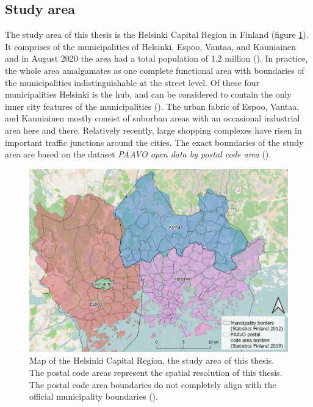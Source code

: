 \subsection{Study area}
\justify

The study area of this thesis is the Helsinki Capital Region in Finland (figure \ref{fig:thesis_resarea}). It comprises of the municipalities of Helsinki, Espoo, Vantaa, and Kauniainen and in August 2020 the area had a total population of 1.2 million (\cite{StatisticsFinland2020a}). In practice, the whole area amalgamates as one complete functional area with boundaries of the municipalities indistinguishable at the street level. Of these four municipalities Helsinki is the hub, and can be considered to contain the only inner city features of the municipalities (\cite{FinnishEnvironmentInstitute2013}). The urban fabric of Espoo, Vantaa, and Kauniainen mostly consist of suburban areas with an occasional industrial area here and there. Relatively recently, large shopping complexes have risen in important traffic junctions around the cities. The exact boundaries of the study area are based on the dataset \textit{PAAVO open data by postal code area} (\cite{StatisticsFinland2019a}).

\begin{figure}[H]%
    \includegraphics[width=\textwidth]{images/thesis_resarea.png}
    \caption[Study area]{Map of the Helsinki Capital Region, the study area of this thesis. The postal code areas represent the spatial resolution of this thesis. The postal code area boundaries do not completely align with the official municipality boundaries (\cite{OpenStreetMap}).}%
    \label{fig:thesis_resarea}%
\end{figure}

